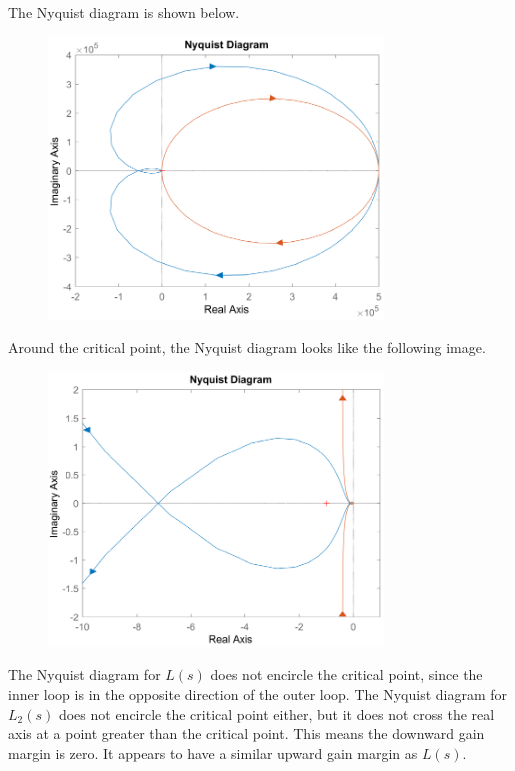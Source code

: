\documentclass[12pt]{article}
\begin{document}
The Nyquist diagram is shown below.
\begin{figure}[H]
    \begin{center}
        \includegraphics[width=3.5in]{problem5f-1.pdf}
    \end{center}
\end{figure}
Around the critical point, the Nyquist diagram looks like the following image.
\begin{figure}[H]
    \begin{center}
        \includegraphics[width=3.5in]{problem5f-2.pdf}
    \end{center}
\end{figure}
The Nyquist diagram for \(L(s)\) does not encircle the critical point, since the inner loop is in the opposite direction
of the outer loop. The Nyquist diagram for \(L_2(s)\) does not encircle the critical point either, but it does not
cross the real axis at a point greater than the critical point. This means the downward gain margin is zero. It appears
to have a similar upward gain margin as \(L(s)\).
\end{document}
